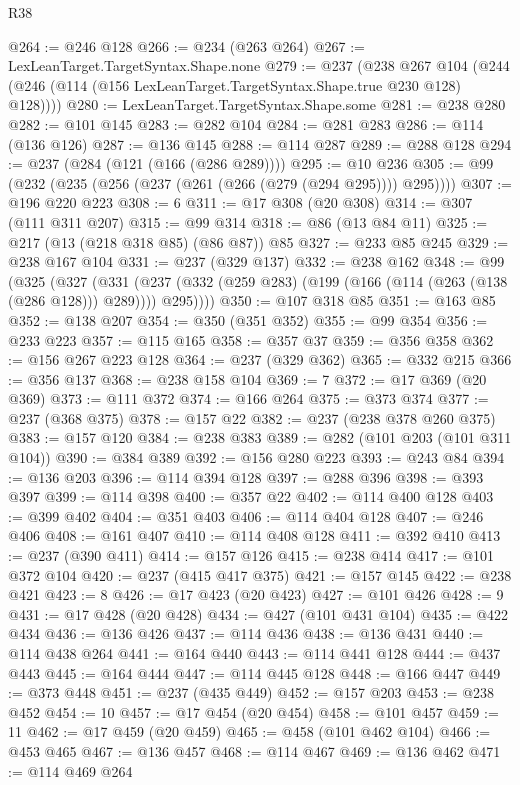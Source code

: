 \begin{lexlean}{R38}
\begin{coremodule}
@264 := @246 @128
@266 := @234 (@263 @264)
@267 := LexLeanTarget.TargetSyntax.Shape.none
@279 := @237
    (@238
      @267
      @104
      (@244 (@246 (@114 (@156 LexLeanTarget.TargetSyntax.Shape.true @230 @128) @128))))
@280 := LexLeanTarget.TargetSyntax.Shape.some
@281 := @238 @280
@282 := @101 @145
@283 := @282 @104
@284 := @281 @283
@286 := @114 (@136 @126)
@287 := @136 @145
@288 := @114 @287
@289 := @288 @128
@294 := @237 (@284 (@121 (@166 (@286 @289))))
@295 := @10 @236
@305 := @99 (@232 (@235 (@256 (@237 (@261 (@266 (@279 (@294 @295)))) @295))))
@307 := @196 @220 @223
@308 := 6
@311 := @17 @308 (@20 @308)
@314 := @307 (@111 @311 @207)
@315 := @99 @314
@318 := @86 (@13 @84 @11)
@325 := @217 (@13 (@218 @318 @85) (@86 @87)) @85
@327 := @233 @85 @245
@329 := @238 @167 @104
@331 := @237 (@329 @137)
@332 := @238 @162
@348 := @99
    (@325
      (@327
        (@331 (@237 (@332 (@259 @283) (@199 (@166 (@114 (@263 (@138 (@286 @128))) @289)))) @295))))
@350 := @107 @318 @85
@351 := @163 @85
@352 := @138 @207
@354 := @350 (@351 @352)
@355 := @99 @354
@356 := @233 @223
@357 := @115 @165
@358 := @357 @37
@359 := @356 @358
@362 := @156 @267 @223 @128
@364 := @237 (@329 @362)
@365 := @332 @215
@366 := @356 @137
@368 := @238 @158 @104
@369 := 7
@372 := @17 @369 (@20 @369)
@373 := @111 @372
@374 := @166 @264
@375 := @373 @374
@377 := @237 (@368 @375)
@378 := @157 @22
@382 := @237 (@238 @378 @260 @375)
@383 := @157 @120
@384 := @238 @383
@389 := @282 (@101 @203 (@101 @311 @104))
@390 := @384 @389
@392 := @156 @280 @223
@393 := @243 @84
@394 := @136 @203
@396 := @114 @394 @128
@397 := @288 @396
@398 := @393 @397
@399 := @114 @398
@400 := @357 @22
@402 := @114 @400 @128
@403 := @399 @402
@404 := @351 @403
@406 := @114 @404 @128
@407 := @246 @406
@408 := @161 @407
@410 := @114 @408 @128
@411 := @392 @410
@413 := @237 (@390 @411)
@414 := @157 @126
@415 := @238 @414
@417 := @101 @372 @104
@420 := @237 (@415 @417 @375)
@421 := @157 @145
@422 := @238 @421
@423 := 8
@426 := @17 @423 (@20 @423)
@427 := @101 @426
@428 := 9
@431 := @17 @428 (@20 @428)
@434 := @427 (@101 @431 @104)
@435 := @422 @434
@436 := @136 @426
@437 := @114 @436
@438 := @136 @431
@440 := @114 @438 @264
@441 := @164 @440
@443 := @114 @441 @128
@444 := @437 @443
@445 := @164 @444
@447 := @114 @445 @128
@448 := @166 @447
@449 := @373 @448
@451 := @237 (@435 @449)
@452 := @157 @203
@453 := @238 @452
@454 := 10
@457 := @17 @454 (@20 @454)
@458 := @101 @457
@459 := 11
@462 := @17 @459 (@20 @459)
@465 := @458 (@101 @462 @104)
@466 := @453 @465
@467 := @136 @457
@468 := @114 @467
@469 := @136 @462
@471 := @114 @469 @264

\end{coremodule}
\end{lexlean}

